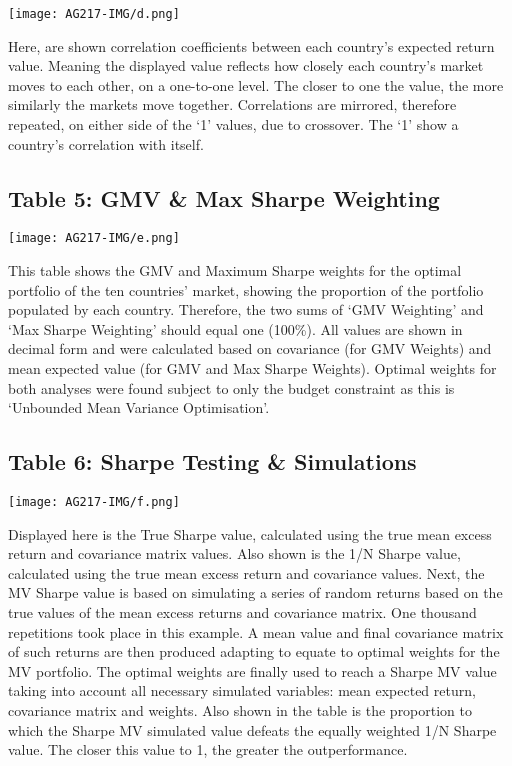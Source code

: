 \documentclass[11pt, english]{article}
\begin{document}
	\begin{center}
                \texttt{[image: AG217-IMG/d.png]}    
        \end{center}

	Here, are shown correlation coefficients between each country’s expected return value. Meaning the displayed value reflects how closely each country’s market moves to each other, on a one-to-one level. The closer to one the value, the more similarly the markets move together. Correlations are mirrored, therefore repeated, on either side of the ‘1’ values, due to crossover. The ‘1’ show a country’s correlation with itself.

	\subsection{Table 5: GMV \& Max Sharpe Weighting}
	
	\begin{center}
                \texttt{[image: AG217-IMG/e.png]}    
        \end{center}

	This table shows the GMV and Maximum Sharpe weights for the optimal portfolio of the ten countries’ market, showing the proportion of the portfolio populated by each country. Therefore, the two sums of `GMV Weighting' and `Max Sharpe Weighting' should equal one (100\%). All values are shown in decimal form and were calculated based on covariance (for GMV Weights) and mean expected value (for GMV and Max Sharpe Weights). Optimal weights for both analyses were found subject to only the budget constraint as this is `Unbounded Mean Variance Optimisation'. 

	\subsection{Table 6: Sharpe Testing \& Simulations}

	\begin{center}
                \texttt{[image: AG217-IMG/f.png]}    
        \end{center}

	Displayed here is the True Sharpe value, calculated using the true mean excess return and covariance matrix values. Also shown is the 1/N Sharpe value, calculated using the true mean excess return and covariance values. Next, the MV Sharpe value is based on simulating a series of random returns based on the true values of the mean excess returns and covariance matrix. One thousand repetitions took place in this example. A mean value and final covariance matrix of such returns are then produced adapting to equate to optimal weights for the MV portfolio. The optimal weights are finally used to reach a Sharpe MV value taking into account all necessary simulated variables: mean expected return, covariance matrix and weights. Also shown in the table is the proportion to which the Sharpe MV simulated value defeats the equally weighted 1/N Sharpe value. The closer this value to 1, the greater the outperformance.
\end{document}

